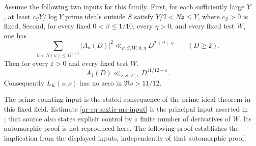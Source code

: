 \begin{proposition}\label{qr-prop-sextic}
Assume the following two inputs for this family.
First, for each sufficiently large $Y$, at least $c_S Y/\log Y$
prime ideals outside $S$ satisfy $Y/2<N\mathfrak p\leq Y$, where
$c_S>0$ is fixed. Second, for every fixed $0<\vartheta\leq1/10$,
every $\eta>0$, and every fixed test $W$, one has
\begin{equation}\label{qr-eq-sextic-ms-input}
 \sum_{0<N(u)\leq D^{1+\vartheta}}|A_u(D)|^2
 \ll_{\nu,S,W,\vartheta,\eta}D^{2+\vartheta+\eta}
 \qquad(D\geq2).
\end{equation}
Then for every $\varepsilon>0$ and every fixed test $W$,
\begin{equation}\label{qr-eq-sextic-conclusion}
 A_1(D)\ll_{\nu,S,W,\varepsilon}D^{11/12+\varepsilon}.
\end{equation}
Consequently $L_K(s,\nu)$ has no zero in $\Re s>11/12$.
\end{proposition}

The prime-counting input is the stated consequence of the prime ideal
theorem in this fixed field. Estimate \eqref{qr-eq-sextic-ms-input}
is the principal input asserted in \cite[Section~3]{OpenAIOctober};
that source also states explicit control by a finite number of
derivatives of $W$. Its automorphic proof is not reproduced here.
The following proof establishes the implication from the displayed
inputs, independently of that automorphic proof.

